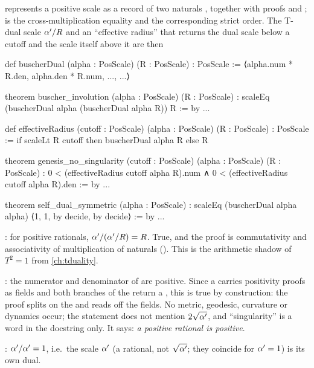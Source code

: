  represents a positive scale
as a record  of two naturals ,  together with proofs
 and ;  is the
cross-multiplication equality  and 
the corresponding strict order. The T-dual scale $\alpha'/R$ and an ``effective radius'' that
returns the dual scale below a cutoff and the scale itself above it are then
\begin{leancode}
def buscherDual (alpha : PosScale) (R : PosScale) : PosScale :=
  ⟨alpha.num * R.den, alpha.den * R.num, ..., ...⟩

theorem buscher_involution (alpha : PosScale) (R : PosScale) :
    scaleEq (buscherDual alpha (buscherDual alpha R)) R := by ...

def effectiveRadius (cutoff : PosScale) (alpha : PosScale) (R : PosScale) :
    PosScale :=
  if scaleLt R cutoff then buscherDual alpha R else R

theorem genesis_no_singularity (cutoff : PosScale) (alpha : PosScale)
    (R : PosScale) :
    0 < (effectiveRadius cutoff alpha R).num ∧
    0 < (effectiveRadius cutoff alpha R).den := by ...

theorem self_dual_symmetric (alpha : PosScale) :
    scaleEq (buscherDual alpha alpha) ⟨1, 1, by decide, by decide⟩ := by ...
\end{leancode}
\begin{leanbox}
: for positive rationals, $\alpha'/(\alpha'/R)=R$. True, and the proof is
commutativity and associativity of multiplication of naturals (). This is the
arithmetic shadow of $T^2=1$ from \cref{ch:tduality}.

: the numerator and denominator of  are
positive. Since a  carries positivity proofs as fields and both branches of
the  return a , this is true by construction: the proof splits on the
 and reads off the fields. No metric, geodesic, curvature or dynamics occur; the
statement does not mention $2\sqrt{\alpha'}$, and ``singularity'' is a word in the docstring
only. It says: \emph{a positive rational is positive}.

: $\alpha'/\alpha'=1$, i.e.\ the scale $\alpha'$ (a rational, not $\sqrt{\alpha'}$;
they coincide for $\alpha'=1$) is its own dual.
\end{leanbox}

